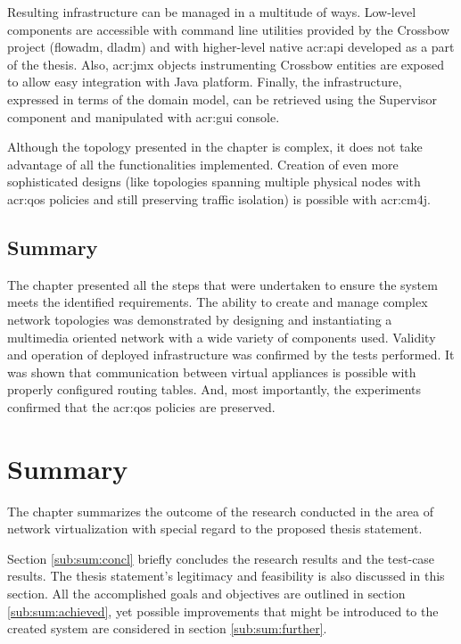 \documentclass[11pt,openany]{book}
\begin{document}
      Resulting infrastructure can be managed in a multitude of ways. Low-level components are accessible with command
      line utilities provided by the Crossbow project (flowadm, dladm) and with higher-level native \gls{acr:api}
      developed as a part of the thesis. Also, \gls{acr:jmx} objects instrumenting Crossbow entities are exposed to
      allow easy integration with Java platform. Finally, the infrastructure, expressed in terms of the domain model,
      can be retrieved using the Supervisor component and manipulated with \gls{acr:gui} console.

      Although the topology presented in the chapter is complex, it does not take advantage of all the functionalities
      implemented. Creation of even more sophisticated designs (like topologies spanning multiple physical nodes with
      \gls{acr:qos} policies and still preserving traffic isolation) is possible with \gls{acr:cm4j}.


    \section*{Summary}

      The chapter presented all the steps that were undertaken to ensure the system meets the identified requirements.
      The ability to create and manage complex network topologies was demonstrated by designing and instantiating
      a multimedia oriented network with a wide variety of components used. Validity and operation of deployed
      infrastructure was confirmed by the tests performed. It was shown that communication between virtual appliances is
      possible with properly configured routing tables. And, most importantly, the experiments confirmed that
      the \gls{acr:qos} policies are preserved.


  \chapter{Summary}
  \label{chap:sum}

	  The chapter summarizes the outcome of the research conducted in the area of network virtualization with special regard to 
	  the proposed thesis statement.
	
	  Section \ref{sub:sum:concl} briefly concludes the research results and the test-case results. The thesis statement's legitimacy and feasibility 
	  is also discussed in this section. All the accomplished goals and objectives are outlined in section \ref{sub:sum:achieved}, yet
	  possible improvements that might be introduced to the created system are considered in section \ref{sub:sum:further}.
\end{document}
